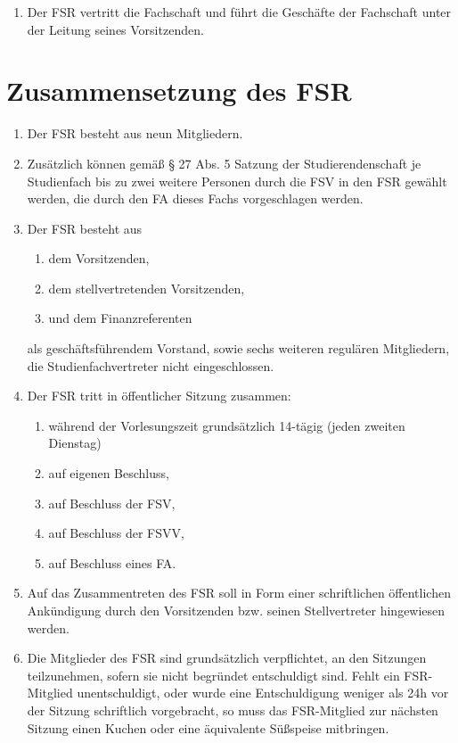 \documentclass{article}
\providecommand{\tightlist}{\setlength{\itemsep}{0pt}\setlength{\parskip}{0pt}}
\begin{document}
\begin{enumerate}[(1)]
	\item Der FSR vertritt die Fachschaft und führt die Geschäfte der Fachschaft unter der Leitung seines Vorsitzenden.
\end{enumerate}

\section{Zusammensetzung des FSR}\label{zusammensetzung-des-fsr}

\begin{enumerate}[(1)]
	\item Der FSR besteht aus neun Mitgliedern.
	\item Zusätzlich können gemäß § 27 Abs. 5 Satzung der Studierendenschaft je Studienfach bis zu zwei weitere Personen durch die FSV in den FSR gewählt werden, die durch den FA dieses Fachs vorgeschlagen werden.
	\item Der FSR besteht aus
	\begin{enumerate}[1.]
		\tightlist
		\item dem Vorsitzenden,
		\item dem stellvertretenden Vorsitzenden,
		\item und dem Finanzreferenten
	\end{enumerate}
	als geschäftsführendem Vorstand, sowie sechs weiteren regulären Mitgliedern, die Studienfachvertreter nicht eingeschlossen.
	\item Der FSR tritt in öffentlicher Sitzung zusammen:
	\begin{enumerate}[1.]
		\tightlist
		\item während der Vorlesungszeit grundsätzlich 14-tägig (jeden zweiten Dienstag)
		\item auf eigenen Beschluss,
		\item auf Beschluss der FSV,
		\item auf Beschluss der FSVV,
		\item auf Beschluss eines FA.
	\end{enumerate}
	\item Auf das Zusammentreten des FSR soll in Form einer schriftlichen öffentlichen Ankündigung durch den Vorsitzenden bzw. seinen Stellvertreter hingewiesen werden.
	\item Die Mitglieder des FSR sind grundsätzlich verpflichtet, an den Sitzungen teilzunehmen, sofern sie nicht begründet entschuldigt sind. Fehlt ein FSR-Mitglied unentschuldigt, oder wurde eine Entschuldigung weniger als 24h vor der Sitzung schriftlich vorgebracht, so muss das FSR-Mitglied zur nächsten Sitzung einen Kuchen oder eine äquivalente Süßspeise mitbringen.

\end{enumerate}
\end{document}
